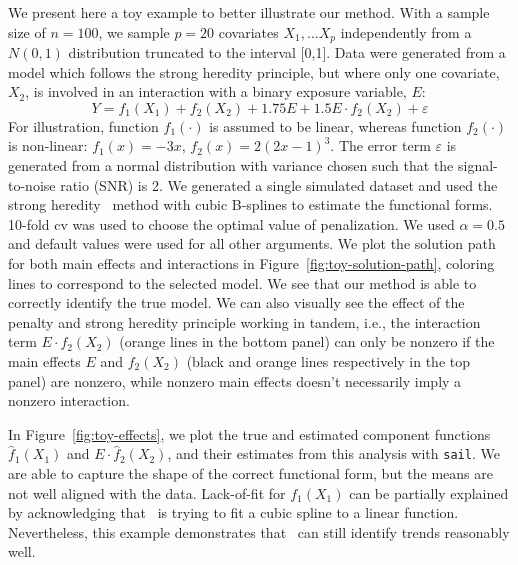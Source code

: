 We present here a toy example to better illustrate our method. With a sample size of $n=100$, we sample $p=20$ covariates $X_1, \ldots X_p$ independently from a $N(0,1)$ distribution truncated to the interval [0,1]. Data were generated from a model which follows the strong heredity principle, but where only one covariate, $X_2$, is involved in an interaction with a binary exposure variable, $E$:
\begin{equation}
Y = f_1(X_1) + f_2(X_2) + 1.75 E + 1.5 E \cdot f_2(X_2) + \varepsilon
\end{equation}
For illustration, function $f_1(\cdot)$ is assumed to be linear, whereas function $f_2(\cdot)$ is non-linear: $f_1(x) = -3x$, $f_2(x) = 2(2x-1)^3$. The error term $\varepsilon$ is generated from a normal distribution with variance chosen such that the signal-to-noise ratio (SNR) is 2.  We generated a single simulated dataset and used the strong heredity \sail ~method with cubic B-splines to estimate the functional forms. 10-fold \ac{cv} was used to choose the optimal value of penalization. We used $\alpha=0.5$ and default values were used for all other arguments. We plot the solution path for both main effects and interactions in Figure~\ref{fig:toy-solution-path}, coloring lines to correspond to the selected model. We see that our method is able to correctly identify the true model. We can also visually see the effect of the penalty and strong heredity principle working in tandem, i.e., the interaction term $E \cdot f_2(X_2)$ (orange lines in the bottom panel) can only be nonzero if the main effects $E$ and $f_2(X_2)$ (black and orange lines respectively in the top panel) are nonzero, while nonzero main effects doesn't necessarily imply a nonzero interaction. 




In Figure~\ref{fig:toy-effects}, we plot the true and estimated component functions $\hat{f}_1(X_1)$ and $E \cdot \hat{f}_2(X_2)$, and their estimates from this analysis with \texttt{sail}. We are able to capture the shape of the correct functional form, but the means are not well aligned with the data. Lack-of-fit for $f_1(X_1)$ can be partially explained by acknowledging that \sail ~is trying to fit a cubic spline to a linear function. Nevertheless, this example demonstrates that \sail ~can still identify trends reasonably well. 


